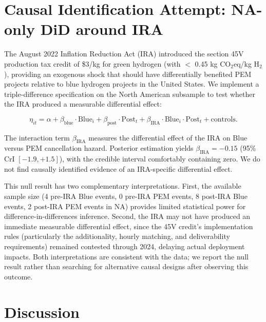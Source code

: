 \documentclass[11pt,a4paper]{article}
\newcommand{\bblue}{\beta_{\mathrm{blue}}}
\begin{document}
\section{Causal Identification Attempt: NA-only DiD around IRA}
\label{sec:ch7-did}

The August 2022 Inflation Reduction Act (IRA) introduced the section 45V production tax credit of \$3/kg for green hydrogen (with $<$ 0.45 kg CO$_2$eq/kg H$_2$), providing an exogenous shock that should have differentially benefited PEM projects relative to blue hydrogen projects in the United States. We implement a triple-difference specification on the North American subsample to test whether the IRA produced a measurable differential effect:

\begin{equation}
\eta_{it} = \alpha + \bblue \cdot \mathrm{Blue}_i + \beta_{\mathrm{post}} \cdot \mathrm{Post}_t + \beta_{\mathrm{IRA}} \cdot \mathrm{Blue}_i \cdot \mathrm{Post}_t + \text{controls}.
\end{equation}

The interaction term $\beta_{\mathrm{IRA}}$ measures the differential effect of the IRA on Blue versus PEM cancellation hazard. Posterior estimation yields $\beta_{\mathrm{IRA}} = -0.15$ (95\% CrI $[-1.9, +1.5]$), with the credible interval comfortably containing zero. We do not find causally identified evidence of an IRA-specific differential effect.

This null result has two complementary interpretations. First, the available sample size (4 pre-IRA Blue events, 0 pre-IRA PEM events, 8 post-IRA Blue events, 2 post-IRA PEM events in NA) provides limited statistical power for difference-in-differences inference. Second, the IRA may not have produced an immediate measurable differential effect, since the 45V credit's implementation rules (particularly the additionality, hourly matching, and deliverability requirements) remained contested through 2024, delaying actual deployment impacts. Both interpretations are consistent with the data; we report the null result rather than searching for alternative causal designs after observing this outcome.

\section{Discussion}
\label{sec:ch7-discussion}
\end{document}
